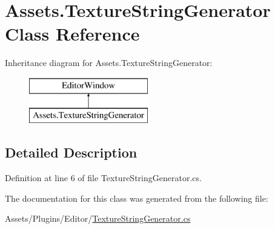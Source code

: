 \hypertarget{class_assets_1_1_texture_string_generator}{}\section{Assets.\+Texture\+String\+Generator Class Reference}
\label{class_assets_1_1_texture_string_generator}
Inheritance diagram for Assets.\+Texture\+String\+Generator\+:\begin{figure}[H]
\begin{center}
\leavevmode
\includegraphics[height=2.000000cm]{class_assets_1_1_texture_string_generator}
\end{center}
\end{figure}


\subsection{Detailed Description}


Definition at line 6 of file Texture\+String\+Generator.\+cs.



The documentation for this class was generated from the following file\+:\begin{DoxyCompactItemize}
\item 
Assets/\+Plugins/\+Editor/\mbox{\hyperlink{_texture_string_generator_8cs}{Texture\+String\+Generator.\+cs}}\end{DoxyCompactItemize}
